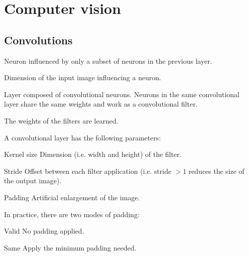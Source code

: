 \chapter{Computer vision}


\section{Convolutions}

\begin{description}
    \item[Convolution neuron] 
        Neuron influenced by only a subset of neurons in the previous layer.
        
    \item[Receptive field] 
        Dimension of the input image influencing a neuron.

    \item[Convolutional layer] 
        Layer composed of convolutional neurons.
        Neurons in the same convolutional layer share the same weights and work as a convolutional filter.

        \begin{remark}
            The weights of the filters are learned.
        \end{remark}

        A convolutional layer has the following parameters:
        \begin{descriptionlist}
            \item[Kernel size] 
                Dimension (i.e. width and height) of the filter.

            \item[Stride] 
                Offset between each filter application (i.e. stride $>1$ reduces the size of the output image).

            \item[Padding] 
                Artificial enlargement of the image.
                
                In practice, there are two modes of padding:
                \begin{descriptionlist}
                    \item[Valid] No padding applied.
                    \item[Same] Apply the minimum padding needed.
                \end{descriptionlist}


\end{descriptionlist}
\end{description}
